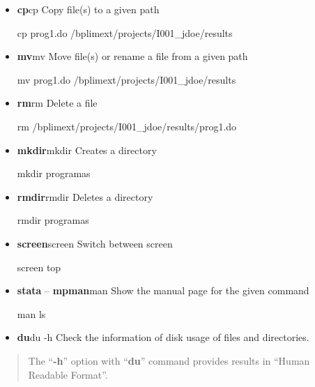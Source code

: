 \documentclass[]{book}
\providecommand{\tightlist}{%
  \setlength{\itemsep}{0pt}\setlength{\parskip}{0pt}}
\begin{document}
\begin{itemize}
\item
  \textbf{cp}cp Copy file(s) to a given path

  cp prog1.do /bplimext/projects/I001\_jdoe/results
\end{itemize}

\begin{itemize}
\item
  \textbf{mv}mv Move file(s) or rename a file from a given path

  mv prog1.do /bplimext/projects/I001\_jdoe/results
\end{itemize}

\begin{itemize}
\item
  \textbf{rm}rm Delete a file

  rm /bplimext/projects/I001\_jdoe/results/prog1.do
\end{itemize}

\begin{itemize}
\item
  \textbf{mkdir}mkdir Creates a directory

  mkdir programas
\end{itemize}

\begin{itemize}
\item
  \textbf{rmdir}rmdir Deletes a directory

  rmdir programas
\end{itemize}

\begin{itemize}
\item
  \textbf{screen}screen Switch between screen

  screen top
\end{itemize}

\begin{itemize}
\item
  \textbf{stata} -- \textbf{mpman}man Show the manual page for the given command

  man ls
\end{itemize}

\begin{itemize}
\tightlist
\item
  \textbf{du}du -h Check the information of disk usage of files and
  directories.
\end{itemize}

\begin{quote}
The ``\textbf{-h}'' option with ``\textbf{du}'' command provides results in ``Human
Readable Format''.
\end{quote}
\end{document}
